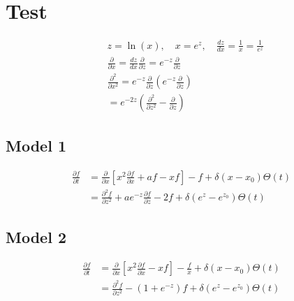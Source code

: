 \documentclass{article}
\begin{document}
\section{Test}
    \begin{equation}
        \begin{split}
            &z = \ln(x), \quad x = e^z, \quad \frac{dz}{dx} = \frac{1}{x} = \frac{1}{e^z}
            \\
            & \frac{\partial }{\partial x} = \frac{dz}{dx} \frac{\partial } {\partial z}
            = e^{-z} \frac{\partial }{\partial z}
            \\
            & \frac{\partial^2 }{\partial x^2} = e^{-z} \frac{\partial } {\partial z}
            \left(e^{-z} \frac{\partial }{\partial z}\right) 
            \\
            & = e^{-2z}\left( \frac{\partial^2}{\partial z^2} - \frac{\partial }{\partial z}
                       \right)
        \end{split}
    \end{equation}
\subsection{Model 1}
    \begin{equation}
        \begin{split}
            \frac{\partial f} {\partial t} &= \frac{\partial}{\partial x}
            \left[x^2 \frac{\partial f}{\partial x} + af - xf\right]
             - f 
             + \delta(x-x_0)\Theta(t)
             \\
            &= \frac{\partial^2 f}{\partial z^2}
            + ae^{-z} \frac{\partial f}{\partial z}
            - 2f
            + \delta(e^{z}-e^{z_0})\Theta(t)
        \end{split}
    \end{equation}

\subsection{Model 2}
    \begin{equation}
        \begin{split}
            \frac{\partial f} {\partial t} &= \frac{\partial}{\partial x}
            \left[x^2 \frac{\partial f}{\partial x} - xf\right]
             - \frac{f}{x}
             + \delta(x-x_0)\Theta(t)
             \\
            &= \frac{\partial^2 f}{\partial z^2}
            - \left(1+e^{-z}\right) f
            + \delta(e^{z}-e^{z_0})\Theta(t)
        \end{split}
    \end{equation}
\end{document}
